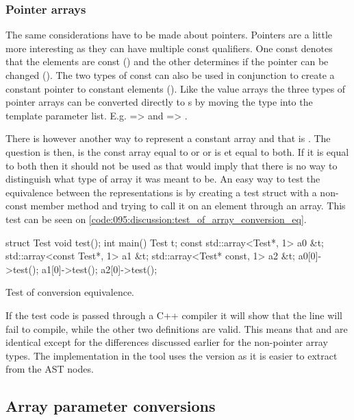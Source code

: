 \subsubsection*{Pointer arrays}

The same considerations have to be made about pointers. Pointers are a little more interesting as they can have multiple const qualifiers. One const denotes that the elements are const () and the other determines if the pointer can be changed (). The two types of const can also be used in conjunction to create a constant pointer to constant elements (). Like the value arrays the three types of pointer arrays can be converted directly to s by moving the type into the template parameter list. E.g.  =>  and  => .

There is however another way to represent a constant array and that is . The question is then, is the const array equal to  or  or is et equal to both. If it is equal to both then it should not be used as that would imply that there is no way to distinguish what type of array it was meant to be. An easy way to test the equivalence between the representations is by creating a test struct with a non-const member method and trying to call it on an element through an array. This test can be seen on \cref{code:095:discussion:test_of_array_conversion_eq}.

\begin{listing}[H]
    \begin{cppcode}
struct Test {void test(){}};
int main() {
    Test t;
    const std::array<Test*, 1> a0 {&t};
    std::array<const Test*, 1> a1 {&t};
    std::array<Test* const, 1> a2 {&t};
    a0[0]->test();
    a1[0]->test();
    a2[0]->test();
}
    \end{cppcode}
    \caption{Test of conversion equivalence.}
    \label{code:095:discussion:test_of_array_conversion_eq}
\end{listing}

If the test code is passed through a C++ compiler it will show that the  line will fail to compile, while the other two definitions are valid. This means that  and  are identical except for the differences discussed earlier for the non-pointer array types. The implementation in the tool uses the  version as it is easier to extract from the AST nodes.

\subsection{Array parameter conversions}\label{subsec:095disc:arrayParm}

